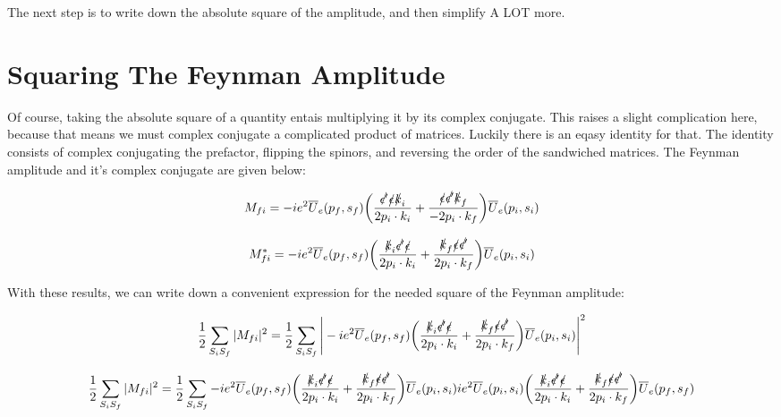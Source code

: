 \documentclass[a4]{article}
\begin{document}
    The next step is to write down the absolute square of the amplitude, and then simplify A LOT more.

    \section*{Squaring The Feynman Amplitude}

    Of course, taking the absolute square of a quantity entais multiplying it by its complex conjugate. This raises a slight complication here, because that means we must complex conjugate a complicated product of matrices.
    Luckily there is an eqasy identity for that. The identity consists of complex conjugating the prefactor, flipping the spinors, and reversing the order of the sandwiched matrices. The Feynman amplitude and it's complex
    conjugate are given below:

    \begin{equation}
        M_{fi} = - i e^2 \overline{U}_e (p_f, s_f) \bigg(\frac{\slashed{\epsilon'} \slashed{\epsilon} \slashed{k}_i}{2 p_i \cdot k_i} + \frac{\slashed{\epsilon} \slashed{\epsilon'} \slashed{k}_f}{- 2 p_i \cdot k_f} \bigg) \overline{U}_e (p_i, s_i)
    \end{equation}

    \begin{equation}
        M_{fi}^* = - i e^2 \overline{U}_e (p_f, s_f) \bigg(\frac{\slashed{k}_i \slashed{\epsilon'} \slashed{\epsilon}}{2 p_i \cdot k_i} + \frac{\slashed{k}_f \slashed{\epsilon} \slashed{\epsilon'}}{2 p_i \cdot k_f} \bigg) \overline{U}_e (p_i, s_i)
    \end{equation}

    With these results, we can write down a convenient expression for the needed square of the Feynman amplitude:

    \begin{equation}
        \frac{1}{2} \sum_{S_i S_f} |M_{fi}|^2 = \frac{1}{2} \sum_{S_i S_f} \Bigg|- i e^2 \overline{U}_e (p_f, s_f) \bigg(\frac{\slashed{k}_i \slashed{\epsilon'} \slashed{\epsilon}}{2 p_i \cdot k_i} + \frac{\slashed{k}_f \slashed{\epsilon} \slashed{\epsilon'}}{2 p_i \cdot k_f} \bigg) \overline{U}_e (p_i, s_i) \Bigg|^2
    \end{equation}

    \begin{equation}
        \frac{1}{2} \sum_{S_i S_f} |M_{fi}|^2 = \frac{1}{2} \sum_{S_i S_f} - i e^2 \overline{U}_e (p_f, s_f) \bigg(\frac{\slashed{k}_i \slashed{\epsilon'} \slashed{\epsilon}}{2 p_i \cdot k_i} + \frac{\slashed{k}_f \slashed{\epsilon} \slashed{\epsilon'}}{2 p_i \cdot k_f} \bigg) \overline{U}_e (p_i, s_i) i e^2 \overline{U}_e (p_i, s_i) \bigg(\frac{\slashed{k}_i \slashed{\epsilon'} \slashed{\epsilon}}{2 p_i \cdot k_i} + \frac{\slashed{k}_f \slashed{\epsilon} \slashed{\epsilon'}}{2 p_i \cdot k_f} \bigg) \overline{U}_e (p_f, s_f)
    \end{equation}
\end{document}
